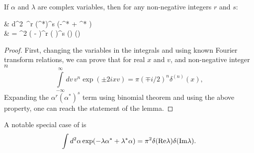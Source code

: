 \begin{lemma}
\label{lmm:c-numbers:fourier-of-moments}
	If $\alpha$ and $\lambda$ are complex variables,
	then for any non-negative integers $r$ and $s$:
	\begin{eqn}
		& \int d^2\alpha\, \alpha^r (\alpha^*)^s \exp(-\lambda \alpha^* + \lambda^* \alpha) \\
		& = \pi^2
			\left( -\frac{\partial}{\partial \lambda^*} \right)^r
			\left( \frac{\partial}{\partial \lambda} \right)^s
			\delta(\Real \lambda) \delta(\Imag \lambda)
	\end{eqn}
\end{lemma}
\begin{proof}
First, changing the variables in the integrals and using known Fourier transform relations, we can prove that for real $x$ and $v$, and non-negative integer $n$
\begin{equation*}
	\int\limits_{-\infty}^{\infty} dv\, v^n \exp(\pm 2 i x v)
	= \pi (\mp i / 2)^n \delta^{(n)}(x),
\end{equation*}
Expanding the $\alpha^r (\alpha^*)^s$ term using binomial theorem and using the above property, one can reach the statement of the lemma.
\end{proof}

A notable special case of  is
\begin{equation*}
	\int d^2\alpha \exp(-\lambda \alpha^* + \lambda^* \alpha)
	= \pi^2 \delta(\mathrm{Re} \lambda) \delta(\mathrm{Im} \lambda).
\end{equation*}


